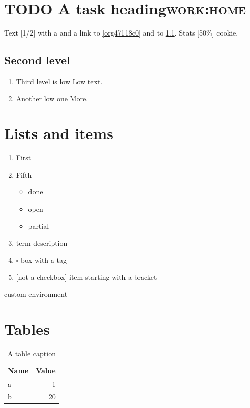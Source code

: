 \section{{\bfseries\sffamily TODO}  A task heading\hfill{}\textsc{work:home}}
\label{sec:org0af2b60}
Text [1/2] with a \label{org47118c0} and a link to \ref{org47118c0} and to \ref{sec:org1f85fd9}.
Stats [50\%] cookie.
\subsection{Second level}
\label{sec:org1f85fd9}
\begin{enumerate}
\item Third level is low
\label{sec:org0e4d337}
Low text.
\item Another low one
\label{sec:org3028fdc}
More.
\end{enumerate}
\section{Lists and items}
\label{sec:org799290e}
\begin{enumerate}
\item First
\setcounter{enumi}{4}
\item Fifth
\begin{itemize}
\item[{$\boxtimes$}] done
\item[{$\square$}] open
\item[{$\boxminus$}] partial
\end{itemize}
\item{term} description
\item{$\square$ box} with a tag
\item {[}not a checkbox] item starting with a bracket
\end{enumerate}

\begin{compactitem}[label=--]
\item custom environment
\end{compactitem}
\section{Tables}
\label{sec:orgc302278}
\begin{table}[H]
\caption[Short]{\label{tab:orgb3336ea}A table caption}
\centering
\begin{tabular}{|l|r|}
Name & Value\\
\hline
a & 1\\
b & 20\\
\end{tabular}
\end{table}

